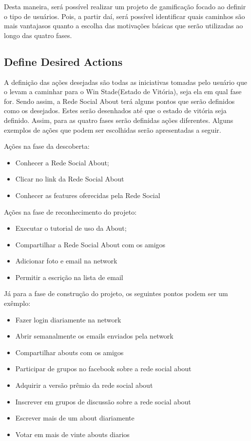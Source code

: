 Desta maneira, será possível realizar um projeto de gamificação focado ao definir o tipo
de usuários. Pois, a partir daí, será possível identificar quais caminhos são mais vantajasos
quanto a escolha das motivações básicas que serão utilizadas ao longo das quatro fases.

\subsection{Define Desired Actions}
\label{sub:define_desired_actions}
A definição das ações desejadas são todas as iniciativas tomadas pelo usuário que o levam a caminhar para
o Win Stade(Estado de Vitória), seja ela em qual fase for. Sendo assim, a Rede Social
About terá alguns pontos que serão definidos como os desejados. Estes serão desenhados
até que o estado de vitória seja definido. Assim, para as quatro fases serão definidas
ações diferentes. Alguns exemplos de ações que podem ser escolhidas serão apresentadas
a seguir.

Ações na fase da descoberta:
\begin{itemize}
    \item Conhecer a Rede Social About;
    \item Clicar no link da Rede Social About
    \item Conhecer as features oferecidas pela Rede Social
\end{itemize}


Ações na fase de reconhecimento do projeto: 
\begin{itemize}
    \item Executar o tutorial de uso da About;
    \item Compartilhar a Rede Social About com os amigos
    \item Adicionar foto e email na network
    \item Permitir a escrição na lista de email
\end{itemize}

Já para a fase de construção do projeto, os seguintes pontos podem ser um
exêmplo:

\begin{itemize}
    \item Fazer login diariamente na network
    \item Abrir semanalmente os emails enviados pela network
    \item Compartilhar abouts com os amigos
    \item Participar de grupos no facebook sobre a rede social about
    \item Adquirir a versão prêmio da rede social about
    \item Inscrever em grupos de discussão sobre a rede social about
    \item Escrever mais de um about diariamente
    \item Votar em mais de vinte abouts diarios
\end{itemize}

